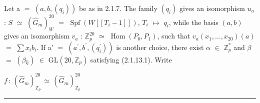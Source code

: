 \documentclass[9pt]{article}
\newcommand{\CanonText}[1]{\par{\fontsize{8.0}{9.35}\selectfont\RaggedRight #1\par}\vspace{2.2pt}}
\newcommand{\CanonDisplay}[1]{\par\vspace{1.2pt}\begin{center}{\fontsize{7.2}{8.4}\selectfont\(\displaystyle #1\)}\end{center}\vspace{1.2pt}}
\begin{document}
\begin{minipage}[t][\dimexpr\textheight-5pt\relax][t]{\textwidth}
\CanonText{Let a \(=\) \((a,b,(q_{i}))\) be as in 2.1.7. The family \((q_{i})\) gives an isomorphism \(u_{a}\) : \(S\) \(\simeq{}\) \((\widehat{G}_{m})_{W}^{20}\) \(=\) \(\operatorname{Spf}(W[[T_{i}-1]])\), \(T_{i}\) \(\mapsto{}\) \(q_{i}\), while the basis \((a,b)\) gives an isomorphism \(v_{a}\) : \(\mathbb{Z}_{p}^{20}\) \(\simeq{}\) \(\operatorname{Hom}(P_{0},P_{1})\), such that \(v_{a}(x_{1},\ldots{},x_{20})(a)\) \(=\) \(\sum{}x_{i}b_{i}\). If a' \(=\) \((a^{\prime},b^{\prime},(q^{\prime}_{i}))\) is another choice, there exist \(\alpha{}\) \(\in{}\) \(\mathbb{Z}_{p}^{*}\) and \(\beta{}\) \(=\) \((\beta{}_{\mathrm{ij}})\) \(\in{}\) \(\mathrm{GL}(20,\mathbb{Z}_{p})\) satisfying (2.1.13.1). Write}
\CanonDisplay{f\,:\,(\widehat{G}_{m})_{\mathbb{Z}_{p}}^{20}\,\simeq{}\,(\widehat{G}_{m})_{\mathbb{Z}_{p}}^{20}}
\vfill
{\color{Accent}\hrule height 0.35pt}\vspace{3pt}
\end{minipage}
\newpage
\end{document}

